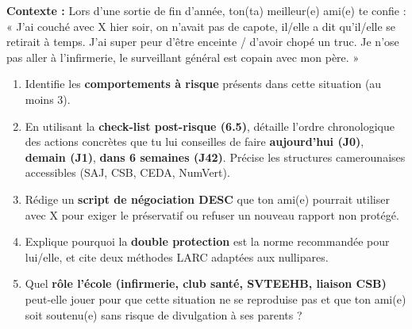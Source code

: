 \documentclass[11pt]{article}
\begin{document}
\begin{exercice}
\textbf{Contexte :} Lors d'une sortie de fin d'année, ton(ta) meilleur(e) ami(e) te confie : « J'ai couché avec X hier soir, on n'avait pas de capote, il/elle a dit qu'il/elle se retirait à temps. J'ai super peur d'être enceinte / d'avoir chopé un truc. Je n'ose pas aller à l'infirmerie, le surveillant général est copain avec mon père. »
\begin{enumerate}
    \item Identifie les \textbf{comportements à risque} présents dans cette situation (au moins 3).
    \item En utilisant la \textbf{check-list post-risque (6.5)}, détaille l'ordre chronologique des actions concrètes que tu lui conseilles de faire \textbf{aujourd'hui (J0)}, \textbf{demain (J1)}, \textbf{dans 6 semaines (J42)}. Précise les structures camerounaises accessibles (SAJ, CSB, CEDA, NumVert).
    \item Rédige un \textbf{script de négociation DESC} que ton ami(e) pourrait utiliser avec X pour exiger le préservatif ou refuser un nouveau rapport non protégé.
    \item Explique pourquoi la \textbf{double protection} est la norme recommandée pour lui/elle, et cite deux méthodes LARC adaptées aux nullipares.
    \item Quel \textbf{rôle l'école (infirmerie, club santé, SVTEEHB, liaison CSB)} peut-elle jouer pour que cette situation ne se reproduise pas et que ton ami(e) soit soutenu(e) sans risque de divulgation à ses parents ?
\end{enumerate}
\end{exercice}
\end{document}
